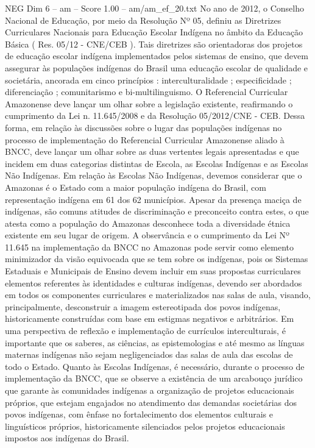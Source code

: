 \begin{textsample}{NEG Dim 6 – am – Score 1.00 – am/am\_ef\_20.txt}
No ano de 2012, o Conselho Nacional de Educação, por meio da Resolução Nº 05, definiu as Diretrizes Curriculares Nacionais para Educação Escolar Indígena no âmbito da Educação Básica ( Res. 05/12 - CNE/CEB ).
Tais diretrizes são orientadoras dos projetos de educação escolar indígena implementados pelos sistemas de ensino, que devem assegurar às populações indígenas do Brasil uma educação escolar de qualidade e societária, ancorada em cinco princípios : interculturalidade ; especificidade ; diferenciação ; comunitarismo e bi-multilinguismo.
O Referencial Curricular Amazonense deve lançar um olhar sobre a legislação existente, reafirmando o cumprimento da Lei n. 11.645/2008 e da Resolução 05/2012/CNE - CEB.
Dessa forma, em relação às discussões sobre o lugar das populações indígenas no processo de implementação do Referencial Curricular Amazonense aliado à BNCC, deve lançar um olhar sobre as duas vertentes legais apresentadas e que incidem em duas categorias distintas de Escola, as Escolas Indígenas e as Escolas Não Indígenas.
Em relação às Escolas Não Indígenas, devemos considerar que o Amazonas é o Estado com a maior população indígena do Brasil, com representação indígena em 61 dos 62 municípios.
Apesar da presença maciça de indígenas, são comuns atitudes de discriminação e preconceito contra estes, o que atesta como a população do Amazonas desconhece toda a diversidade étnica existente em seu lugar de origem.
A observância e o cumprimento da Lei Nº 11.645 na implementação da BNCC no Amazonas pode servir como elemento minimizador da visão equivocada que se tem sobre os indígenas, pois os Sistemas Estaduais e Municipais de Ensino devem incluir em suas propostas curriculares elementos referentes às identidades e culturas indígenas, devendo ser abordados em todos os componentes curriculares e materializados nas salas de aula, visando, principalmente, desconstruir a imagem estereotipada dos povos indígenas, historicamente construídas com base em estigmas negativos e arbitrários.
Em uma perspectiva de reflexão e implementação de currículos interculturais, é importante que os saberes, as ciências, as epistemologias e até mesmo as línguas maternas indígenas não sejam negligenciados das salas de aula das escolas de todo o Estado.
Quanto às Escolas Indígenas, é necessário, durante o processo de implementação da BNCC, que se observe a existência de um arcabouço jurídico que garante às comunidades indígenas a organização de projetos educacionais próprios, que estejam engajados no atendimento das demandas societárias dos povos indígenas, com ênfase no fortalecimento dos elementos culturais e linguísticos próprios, historicamente silenciados pelos projetos educacionais impostos aos indígenas do Brasil.

\end{textsample}
